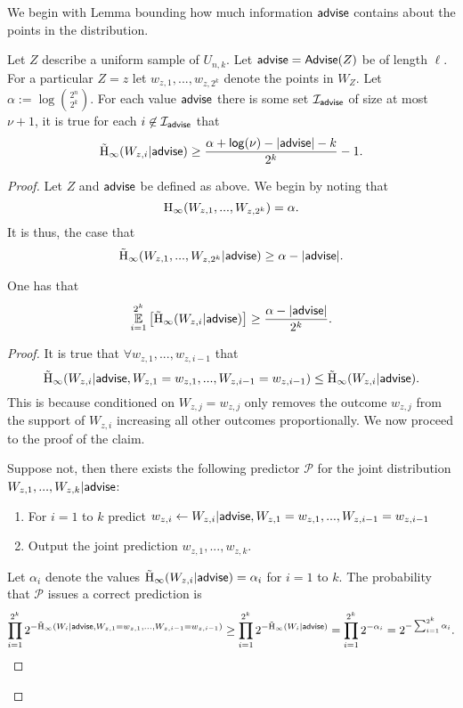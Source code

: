 We begin with Lemma bounding how much information ${\mathsf{advise}}$ contains about the points in the distribution.
\begin{lemma}
Let $Z$ describe a uniform sample of $U_{n,k}$.  Let ${\mathsf{advise}} = {\mathsf{Advise}}(Z)$ be of length $\ell$.
 For a particular $Z=z$ let $w_{z,1},..., w_{z,2^k}$ denote the points in $W_Z$. Let $\alpha:= \log {2^n\choose 2^k}$.  
For each value ${\mathsf{advise}}$ there is some set $\mathcal{I}_{{\mathsf{advise}}}$ of size at most $\nu+1$, it is true for each $i\not \in \mathcal{I}_{\mathsf{advise}}$ that
\[
\tilde{\mathrm{H}}_\infty(W_{z,i} | {\mathsf{advise}}) \ge \frac{\alpha +\mathsf{log}\!\left(\nu\right)-|{\mathsf{advise}}| - k}{2^k} - 1.
\]
\label{lem:entr of members}
\end{lemma}

\begin{proof}
Let $Z$ and ${\mathsf{advise}}$ be defined as above. We begin by noting that 
\[
\mathrm{H}_\infty(W_{z, 1},..., W_{z, 2^k})=\alpha.
\]
 It is thus, the case that 
\[
\tilde{\mathrm{H}}_\infty(W_{z, 1},..., W_{z, 2^ k} | {\mathsf{advise}}) \ge \alpha - |{\mathsf{advise}}|.
\]
\begin{claim}
One has that 
\begin{align*}
\operatorname*{\mathbb{E}}_{i=1}^{2^k} \left[\tilde{\mathrm{H}}_\infty(W_{z, i} | {\mathsf{advise}})\right] \ge \frac{\alpha - |{\mathsf{advise}}|}{2^k}.
\end{align*}
\label{clm:entropy distributes}
\end{claim}
\begin{proof}
It is true that $\forall w_{z,1},..., w_{z,i-1}$ that 
\[
\tilde{\mathrm{H}}_\infty(W_{z,i} | {\mathsf{advise}}, W_{z, 1}=w_{z,1},..., W_{z,i-1}=w_{z,i-1}) \le \tilde{\mathrm{H}}_\infty(W_{z,i} | {\mathsf{advise}}).
\]
This is because conditioned on $W_{z, j} =w_{z,j}$ only removes the outcome $w_{z,j}$ from the support of $W_{z,i}$ increasing all other outcomes proportionally.  
We now proceed to the proof of the claim. 

Suppose not, then there exists the following predictor $\mathcal{P}$ for the joint distribution $W_{z, 1},..., W_{z, k} | {\mathsf{advise}}$:
\begin{enumerate}
\item For $i=1$ to $k$ predict $w_{z,i}\leftarrow W_{z, i}| {\mathsf{advise}}, W_{z,1}=w_{z,1},..., W_{z,i-1}=w_{z,i-1}$
\item Output the joint prediction $w_{z,1},..., w_{z, k}$.  
\end{enumerate}
Let $\alpha_i$ denote the values $\tilde{\mathrm{H}}_\infty(W_{z,i}| {\mathsf{advise}}) = \alpha_i$ for $i=1$ to $k$. 
The probability that $\mathcal{P}$ issues a correct prediction is
\begin{align*}
\prod_{i=1}^{2^k} 2^{-\tilde{\mathrm{H}}_\infty(W_i | {\mathsf{advise}},  W_{z,1}=w_{z,1},..., W_{z,i-1}=w_{z,i-1})} \ge \prod_{i=1}^{2^k} 2^{-\tilde{\mathrm{H}}_\infty(W_i | {\mathsf{advise}})} = \prod_{i=1}^{2^k} 2^{-\alpha_i}  = 2^{-\sum_{i=1}^{2^k} \alpha_i}.
\end{align*}


\end{proof}
\end{proof}

